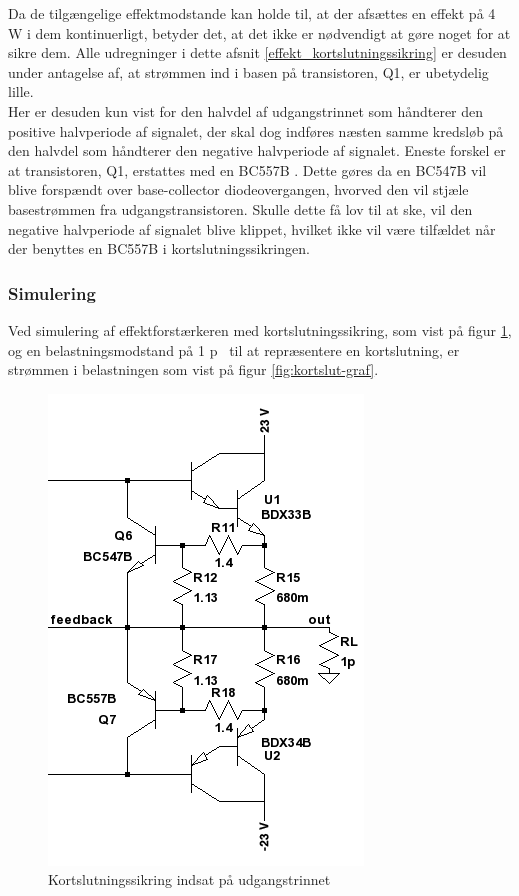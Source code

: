 Da de tilgængelige effektmodstande kan holde til, at der afsættes en effekt på 4 W i dem kontinuerligt, betyder det, at det ikke er nødvendigt at gøre noget for at sikre dem. Alle udregninger i dette afsnit \ref{effekt_kortslutningssikring} er desuden under antagelse af, at strømmen ind i basen på transistoren, Q1, er ubetydelig lille.\\
Her er desuden kun vist for den halvdel af udgangstrinnet som håndterer den positive halvperiode af signalet, der skal dog indføres næsten samme kredsløb på den halvdel som håndterer den negative halvperiode af signalet. Eneste forskel er at transistoren, Q1, erstattes med en BC557B \cite{bc557b-datablad}. Dette gøres da en BC547B vil blive forspændt over base-collector diodeovergangen, hvorved den vil stjæle basestrømmen fra udgangstransistoren. Skulle dette få lov til at ske, vil den negative halvperiode af signalet blive klippet, hvilket ikke vil være tilfældet når der benyttes en BC557B i kortslutningssikringen. 

\subsubsection*{Simulering}

Ved simulering af effektforstærkeren med kortslutningssikring, som vist på figur \ref{fig:kortslut-done}, og en belastningsmodstand på 1 p\ohm~ til at repræsentere en kortslutning, er strømmen i belastningen som vist på figur \ref{fig:kortslut-graf}.

\begin{figure}[h]
\centering
\includegraphics[scale=0.5]{teknisk/effektforstaerker/kortslut-done.png}
\caption{Kortslutningssikring indsat på udgangstrinnet}
\label{fig:kortslut-done}
\end{figure}

